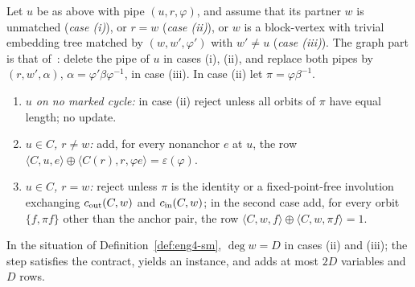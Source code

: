 \begin{definition}[SimplifyMatching]\label{def:eng4-sm}
Let $u$ be as above with pipe $(u,r,\varphi)$, and assume that its partner
$w$ is unmatched (\emph{case (i)}), or $r=w$ (\emph{case (ii)}), or $w$ is a
block-vertex with trivial embedding tree matched by $(w,w',\varphi')$ with
$w'\ne u$ (\emph{case (iii)}). The graph part is that
of~\cite[Section~3.4]{BFR21}: delete the pipe of $u$ in cases (i), (ii),
and replace both pipes by $(r,w',\alpha)$, $\alpha=\varphi'\beta\varphi^{-1}$,
in case (iii). In case (ii) let $\pi=\varphi\beta^{-1}$.
\begin{enumerate}[label=(\alph*),nosep]
\item \emph{$u$ on no marked cycle:} in case (ii) reject unless all orbits of
  $\pi$ have equal length; no update.
\item \emph{$u\in C$, $r\ne w$:} add, for every nonanchor $e$ at $u$, the
  row $\langle C,u,e\rangle\oplus\langle C(r),r,\varphi e\rangle=
  \varepsilon(\varphi)$.
\item \emph{$u\in C$, $r=w$:} reject unless $\pi$ is the identity or a
  fixed-point-free involution exchanging $c_{\mathrm{out}}(C,w)$ and $c_{\mathrm{in}}(C,w)$; in
  the second case add, for every orbit $\{f,\pi f\}$ other than the anchor
  pair, the row $\langle C,w,f\rangle\oplus\langle C,w,\pi f\rangle=1$.
\end{enumerate}
\end{definition}

\begin{lemma}[SimplifyMatching]\label{lem:eng4-sm}
In the situation of Definition~\ref{def:eng4-sm}, $\deg w=D$ in cases (ii)
and (iii); the step satisfies the contract, yields an instance, and adds
at most $2D$ variables and $D$ rows.
\end{lemma}

